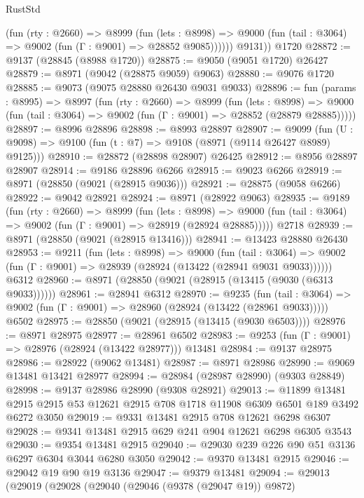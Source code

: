 \begin{lexlean}{RustStd}
\begin{coremodule}
            (fun (rty : @2660) =>
            @8999
              (fun (lets : @8998) =>
              @9000 (fun (tail : @3064) => @9002 (fun (Γ : @9001) => @28852 @9085))))))
        @9131))
    @1720
@28872 := @9137 (@28845 (@8988 @1720))
@28875 := @9050 (@9051 @1720) @26427
@28879 := @8971 (@9042 (@28875 @9059) @9063)
@28880 := @9076 @1720
@28885 := @9073 (@9075 @28880 @26430 @9031 @9033)
@28896 := fun (params : @8995) =>
  @8997
    (fun (rty : @2660) =>
    @8999
      (fun (lets : @8998) =>
      @9000 (fun (tail : @3064) => @9002 (fun (Γ : @9001) => @28852 (@28879 @28885)))))
@28897 := @8996 @28896
@28898 := @8993 @28897
@28907 := @9099
    (fun (U : @9098) => @9100 (fun (t : @7) => @9108 (@8971 (@9114 @26427 @8989) @9125)))
@28910 := @28872 (@28898 @28907) @26425
@28912 := @8956 @28897 @28907
@28914 := @9186 @28896 @6266
@28915 := @9023 @6266
@28919 := @8971 (@28850 (@9021 (@28915 @9036)))
@28921 := @28875 (@9058 @6266)
@28922 := @9042 @28921
@28924 := @8971 (@28922 @9063)
@28935 := @9189
    (fun (rty : @2660) =>
    @8999
      (fun (lets : @8998) =>
      @9000 (fun (tail : @3064) => @9002 (fun (Γ : @9001) => @28919 (@28924 @28885)))))
    @2718
@28939 := @8971 (@28850 (@9021 (@28915 @13416)))
@28941 := @13423 @28880 @26430
@28953 := @9211
    (fun (lets : @8998) =>
    @9000
      (fun (tail : @3064) =>
      @9002 (fun (Γ : @9001) => @28939 (@28924 (@13422 (@28941 @9031 @9033))))))
    @6312
@28960 := @8971 (@28850 (@9021 (@28915 (@13415 (@9030 (@6313 @9033))))))
@28961 := @28941 @6312
@28970 := @9235
    (fun (tail : @3064) => @9002 (fun (Γ : @9001) => @28960 (@28924 (@13422 (@28961 @9033)))))
    @6502
@28975 := @28850 (@9021 (@28915 (@13415 (@9030 @6503))))
@28976 := @8971 @28975
@28977 := @28961 @6502
@28983 := @9253 (fun (Γ : @9001) => @28976 (@28924 (@13422 @28977))) @13481
@28984 := @9137 @28975
@28986 := @28922 (@9062 @13481)
@28987 := @8971 @28986
@28990 := @9069 @13481 @13421 @28977
@28994 := @28984 (@28987 @28990) (@9303 @28849)
@28998 := @9137 @28986 @28990 (@9308 @28921)
@29013 := @11899
    @13481
    @2915
    @2915
    @53
    @12621
    @2915
    @708
    @1718
    @11908
    @6309
    @6501
    @189
    @3492
    @6272
    @3050
@29019 := @9331 @13481 @2915 @708 @12621 @6298 @6307
@29028 := @9341 @13481 @2915 @629 @241 @904 @12621 @6298 @6305 @3543
@29030 := @9354 @13481 @2915
@29040 := @29030 @239 @226 @90 @51 @3136 @6297 @6304 @3044 @6280 @3050
@29042 := @9370 @13481 @2915
@29046 := @29042 @19 @90 @19 @3136
@29047 := @9379 @13481
@29094 := @29013
    (@29019
      (@29028
        (@29040
          (@29046 (@9378 (@29047 @19)) @9872)

\end{coremodule}
\end{lexlean}
